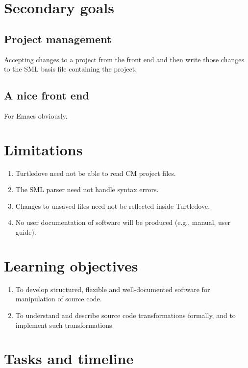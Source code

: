 \documentclass[a4paper,oneside]{article}
\begin{document}
\section{Secondary goals}

\subsection{Project management}
Accepting changes to a project from the front end and then write those changes to the SML basis file
containing the project.

\subsection{A nice front end}
For Emacs obviously.

\section{Limitations}

\begin{enumerate}
\item Turtledove need not be able to read CM project files.

\item The SML parser need not handle syntax errors.

\item Changes to unsaved files need not be reflected inside Turtledove.

\item No user documentation of software will be produced (e.g., manual, user guide).
\end{enumerate}

\section{Learning objectives}

\begin{enumerate}
\item To develop structured, flexible and well-documented software for
      manipulation of source code.
\item To understand and describe source code transformations formally, and to implement such
      transformations.
\end{enumerate}

\section{Tasks and timeline}
\end{document}
